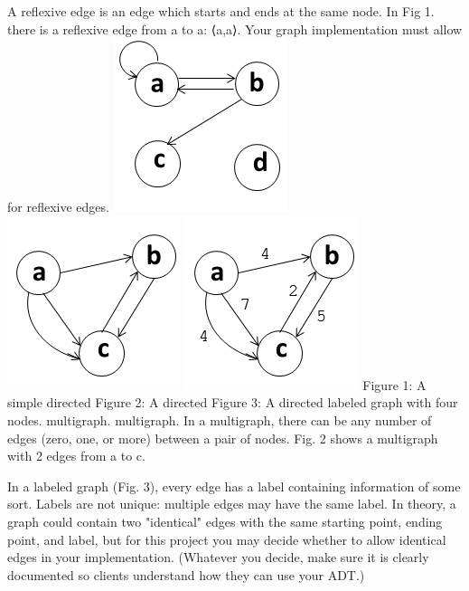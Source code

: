 \documentclass[11pt]{article}
\begin{document}
\noindent A reflexive edge is an edge which starts and ends at the same node. In Fig 1. there is a reflexive edge from a to a: ⟨a,a⟩. Your graph implementation must allow for reflexive edges.
\newline
\includegraphics[]{digraph.png}
\includegraphics[]{multigraph.png}
\includegraphics[]{labeled-graph.png}
\newline
Figure 1: A simple directed \hspace{4em} Figure 2: A directed \hspace{2em} Figure 3:  A directed labeled
\newline
graph with four nodes. \hspace{6em}multigraph. \hspace{6em}multigraph.
\newpage
\noindent In a multigraph, there can be any number of edges (zero, one, or more) between a pair of nodes. Fig. 2 shows a multigraph with 2 edges from a to c.

\noindent In a labeled graph (Fig. 3), every edge has a label containing information of some sort. Labels are not unique: multiple edges may have the same label. In theory, a graph could contain two "identical" edges with the same starting point, ending point, and label, but for this project you may decide whether to allow identical edges in your implementation. (Whatever you decide, make sure it is clearly documented so clients understand how they can use your ADT.)
\end{document}
